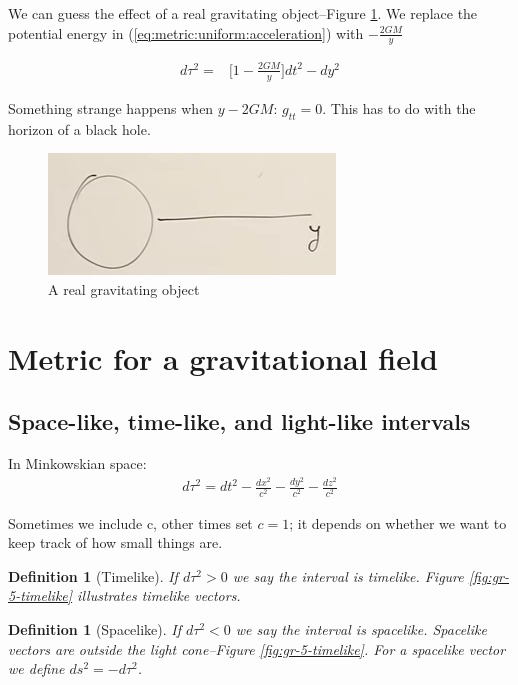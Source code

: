 \documentclass[]{article}
\newtheorem{defn}[thm]{Definition}
\begin{document}
{We can guess the effect of a real gravitating object--Figure \ref{fig:gr-4-gravitating-object}. We replace the potential energy in (\ref{eq:metric:uniform:acceleration}) with $-\frac{2GM}{y}$

\begin{align*}
	d\tau^2 =& \big[1  -\frac{2GM}{y} \big] dt^2 - dy^2
\end{align*}

Something strange happens when $y-2GM$: $g_{tt}=0$. This has to do with the horizon of a black hole.

\begin{figure}[H]
	\caption{A real gravitating object}\label{fig:gr-4-gravitating-object}
	\includegraphics{gr-4-gravitating-object}
\end{figure}



\section{Metric for a gravitational field}

\subsection{Space-like, time-like, and light-like intervals}

In Minkowskian space:
\begin{align*}
	d\tau^2 =dt^2 - \frac{dx^2}{c^2} - \frac{dy^2}{c^2} - \frac{dz^2}{c^2} 
\end{align*}

Sometimes we include c, other times set $c=1$; it depends on whether we want to keep track of how small things are.

\begin{defn}[Timelike]
	If $d\tau^2 >0$ we say the interval is timelike. Figure \ref{fig:gr-5-timelike} illustrates timelike vectors.
\end{defn}

\begin{defn}[Spacelike]
	If $d\tau^2 <0$ we say the interval is spacelike. Spacelike vectors are outside the light cone--Figure \ref{fig:gr-5-timelike}. For a spacelike vector we define $ds^2=-d\tau^2$.
\end{defn}

}
\end{document}
